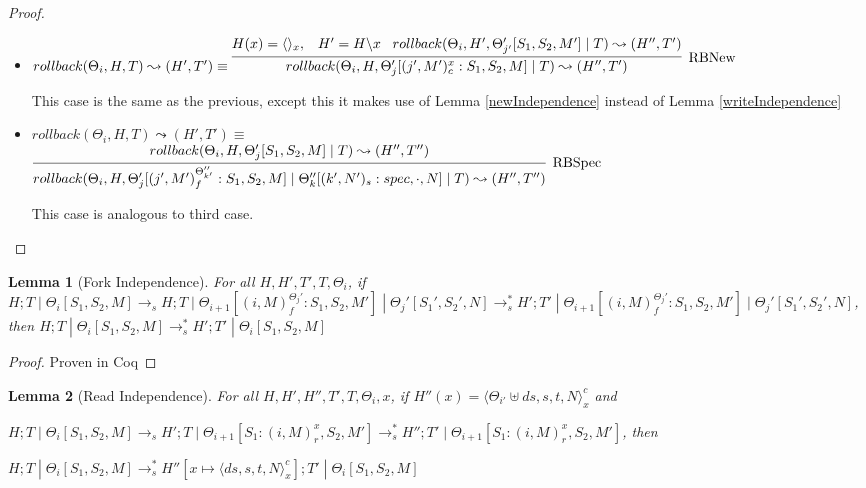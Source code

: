 \documentclass[9pt]{article}
\newtheorem{lemma}{Lemma}
\newcommand\specStep{\rightarrow_{s}}
\begin{document}
\begin{proof}
\begin{itemize}
\item $rollback(\Theta_i, H, T) \leadsto (H', T') \equiv \infer[\text{RBNew}]{rollback(\Theta_i, H, \Theta_j'[(j', M')_c^x : S_1, S_2, M] \; | \; T) \leadsto (H'', T')}{H(x) = \langle\rangle_x, \;\;\; H' = H \backslash x \;\;\; rollback(\Theta_i, H', \Theta_{j'}'[S_1, S_2, M'] \; | \; T) \leadsto (H'', T')}$

This case is the same as the previous, except this it makes use of Lemma \ref{newIndependence} instead of Lemma \ref{writeIndependence}

\item $rollback(\Theta_i, H, T) \leadsto (H', T') \equiv$ \\
$ \infer[\text{RBSpec}]{rollback(\Theta_i, H, \Theta_j'[(j', M')_f^{\Theta_{k'}''} : S_1, S_2, M] \; | \; \Theta_k''[(k', N')_s : spec, \cdot, N] \; | \; T) \leadsto (H'', T'')}{rollback(\Theta_i, H, \Theta_j'[S_1, S_2, M] \; | \; T) \leadsto (H'', T'')}$

This case is analogous to third case.

\end{itemize}

\end{proof}

\begin{lemma}[Fork Independence]
\label{forkIndependence}
For all $H, H', T', T, \Theta_i$, if \\
$H; T \; | \; \Theta_i[S_1, S_2, M] \specStep H; T \; | \; \Theta_{i+1}[(i, M)_f^{\Theta_j'} : S_1, S_2, M'] \; | \; \Theta_j'[S_1', S_2', N] \specStep^* H'; T' \; | \; \Theta_{i+1}[(i, M)_f^{\Theta_j'} : S_1, S_2, M'] \; | \; \Theta_j'[S_1', S_2', N]$, then $H; T \; | \; \Theta_i[S_1, S_2, M] \specStep^* H'; T' \; | \; \Theta_i[S_1, S_2, M]$

\end{lemma}

\begin{proof}
Proven in Coq
\end{proof}

\begin{lemma}[Read Independence]
\label{readIndependence}
For all $H, H', H'', T', T, \Theta_i, x$, if $H''(x) = \langle \Theta_{i'} \uplus ds, s, t, N\rangle_x^c$ and 

$H; T \; | \; \Theta_i[S_1, S_2, M] \specStep H'; T \; | \; \Theta_{i+1}[S_1 : (i, M)_r^x, S_2, M'] \specStep^* H''; T' \; | \; \Theta_{i+1}[S_1 : (i, M)_r^x, S_2, M']$, then 

$H; T \; | \; \Theta_i[S_1, S_2, M] \specStep^* H''[x\mapsto \langle ds, s, t, N\rangle_x^c]; T' \; | \; \Theta_i[S_1, S_2, M]$
\end{lemma}
\end{document}
